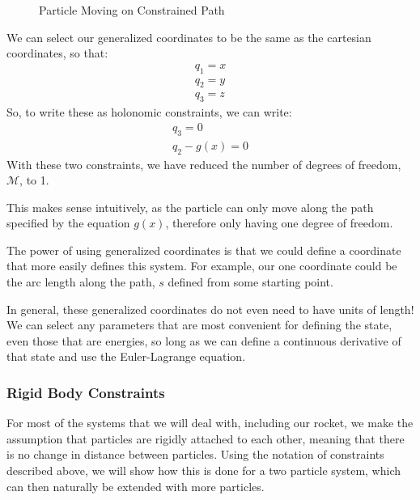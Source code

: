 \documentclass[12pt]{report}
\begin{document}
\begin{figure}[ht]

    \caption{Particle Moving on Constrained Path}
    \label{fig:constrainted path}
\end{figure}
We can select our generalized coordinates to be the same as the cartesian coordinates, so that:
\begin{gather}
    q_1=x\\q_2=y\\q_3=z
\end{gather}
So, to write these as holonomic constraints, we can write:
\begin{gather}
    q_3=0\\
    q_2-g(x)=0
\end{gather}
With these two constraints, we have reduced the number of degrees of freedom, $\mathcal{M}$, to 1.

This makes sense intuitively, as the particle can only move along the path specified by the equation $g(x)$, therefore only having one degree of freedom.

The power of using generalized coordinates is that we could define a coordinate that more easily defines this system. For example, our one coordinate could be the arc length along the path, $s$ defined from some starting point.

In general, these generalized coordinates do not even need to have units of length! We can select any parameters that are most convenient for defining the state, even those that are energies, so long as we can define a continuous derivative of that state and use the Euler-Lagrange equation.

\subsubsection{Rigid Body Constraints}\label{sec: rigid body constraints}
For most of the systems that we will deal with, including our rocket, we make the assumption that particles are rigidly attached to each other, meaning that there is no change in distance between particles. Using the notation of constraints described above, we will show how this is done for a two particle system, which can then naturally be extended with more particles.
\end{document}
